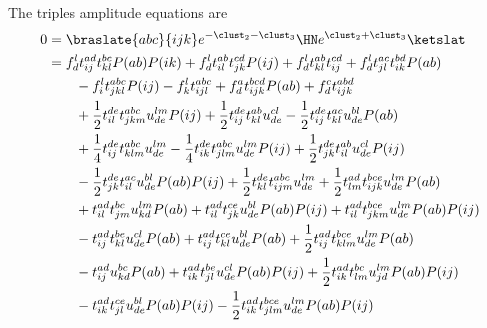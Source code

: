         The triples amplitude equations are
        \begin{align}
            0 & = \braslate{abc}{ijk} e^{-\clust_2 - \clust_3} \HN
            e^{\clust_2 + \clust_3}\ketslat
            \\
            &=
            f^{l}_{d} t^{ad}_{ij} t^{bc}_{kl} P(ab) P(ik)
            + f^{l}_{d} t^{ab}_{il} t^{cd}_{jk} P(ij)
            + f^{l}_{d} t^{ab}_{kl} t^{cd}_{ij}
            + f^{l}_{d} t^{ac}_{jl} t^{bd}_{ik} P(ab)
            \nonumber \\
            &\qquad
            - f^{l}_{i} t^{abc}_{jkl} P(ij)
            - f^{l}_{k} t^{abc}_{ijl}
            + f^{a}_{d} t^{bcd}_{ijk} P(ab)
            + f^{c}_{d} t^{abd}_{ijk}
            \nonumber \\
            &\qquad
            + \frac{1}{2} t^{de}_{il} t^{abc}_{jkm} u^{lm}_{de} P(ij)
            + \frac{1}{2} t^{de}_{ij} t^{ab}_{kl} u^{cl}_{de}
            - \frac{1}{2} t^{de}_{ij} t^{ac}_{kl} u^{bl}_{de} P(ab)
            \nonumber \\
            &\qquad
            + \frac{1}{4} t^{de}_{ij} t^{abc}_{klm} u^{lm}_{de}
            - \frac{1}{4} t^{de}_{ik} t^{abc}_{jlm} u^{lm}_{de} P(ij)
            + \frac{1}{2} t^{de}_{jk} t^{ab}_{il} u^{cl}_{de} P(ij)
            \nonumber \\
            &\qquad
            - \frac{1}{2} t^{de}_{jk} t^{ac}_{il} u^{bl}_{de} P(ab) P(ij)
            + \frac{1}{2} t^{de}_{kl} t^{abc}_{ijm} u^{lm}_{de}
            + \frac{1}{2} t^{ad}_{lm} t^{bce}_{ijk} u^{lm}_{de} P(ab)
            \nonumber \\
            &\qquad
            + t^{ad}_{il} t^{bc}_{jm} u^{lm}_{kd} P(ab)
            + t^{ad}_{il} t^{ce}_{jk} u^{bl}_{de} P(ab) P(ij)
            + t^{ad}_{il} t^{bce}_{jkm} u^{lm}_{de} P(ab) P(ij)
            \nonumber \\
            &\qquad
            - t^{ad}_{ij} t^{be}_{kl} u^{cl}_{de} P(ab)
            + t^{ad}_{ij} t^{ce}_{kl} u^{bl}_{de} P(ab)
            + \frac{1}{2} t^{ad}_{ij} t^{bce}_{klm} u^{lm}_{de} P(ab)
            \nonumber \\
            &\qquad
            - t^{ad}_{ij} u^{bc}_{kd} P(ab)
            + t^{ad}_{ik} t^{be}_{jl} u^{cl}_{de} P(ab) P(ij)
            + \frac{1}{2} t^{ad}_{ik} t^{bc}_{lm} u^{lm}_{jd} P(ab) P(ij)
            \nonumber \\
            &\qquad
            - t^{ad}_{ik} t^{ce}_{jl} u^{bl}_{de} P(ab) P(ij)
            - \frac{1}{2} t^{ad}_{ik} t^{bce}_{jlm} u^{lm}_{de} P(ab) P(ij)

\end{align}
